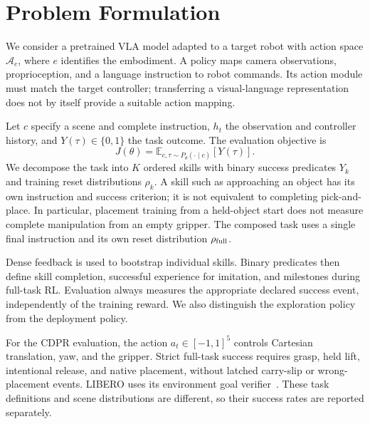 \section{Problem Formulation}\label{sec:problem}
We consider a pretrained VLA model adapted to a target robot with action space $\mathcal A_e$, where $e$ identifies the embodiment. A policy maps camera observations, proprioception, and a language instruction to robot commands. Its action module must match the target controller; transferring a visual-language representation does not by itself provide a suitable action mapping.

Let $c$ specify a scene and complete instruction, $h_t$ the observation and controller history, and $Y(\tau)\in\{0,1\}$ the task outcome. The evaluation objective is
\begin{equation}
J(\theta)=\mathbb{E}_{c,\tau\sim P_\theta(\cdot\mid c)}[Y(\tau)].
\end{equation}
We decompose the task into $K$ ordered skills with binary success predicates $Y_k$ and training reset distributions $\rho_k$. A skill such as approaching an object has its own instruction and success criterion; it is not equivalent to completing pick-and-place. In particular, placement training from a held-object start does not measure complete manipulation from an empty gripper. The composed task uses a single final instruction and its own reset distribution $\rho_{\rm full}$.

Dense feedback is used to bootstrap individual skills. Binary predicates then define skill completion, successful experience for imitation, and milestones during full-task RL. Evaluation always measures the appropriate declared success event, independently of the training reward. We also distinguish the exploration policy from the deployment policy.

For the CDPR evaluation, the action $a_t\in[-1,1]^5$ controls Cartesian translation, yaw, and the gripper. Strict full-task success requires grasp, held lift, intentional release, and native placement, without latched carry-slip or wrong-placement events. LIBERO uses its environment goal verifier~\cite{libero}. These task definitions and scene distributions are different, so their success rates are reported separately.
